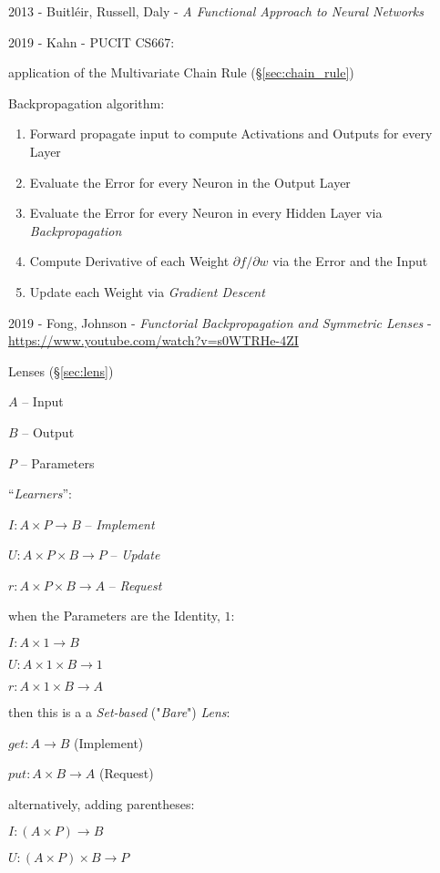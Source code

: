 2013 - Buitl\'eir, Russell, Daly -
\emph{A Functional Approach to Neural Networks}

2019 - Kahn - PUCIT CS667:

application of the Multivariate Chain Rule (\S\ref{sec:chain_rule})

Backpropagation algorithm:
\begin{enumerate}
  \item Forward propagate input to compute Activations and Outputs for every
    Layer
  \item Evaluate the Error for every Neuron in the Output Layer
  \item Evaluate the Error for every Neuron in every Hidden Layer via
    \emph{Backpropagation}
  \item Compute Derivative of each Weight $\partial f / \partial w$ via the
    Error and the Input
  \item Update each Weight via \emph{Gradient Descent}
\end{enumerate}

\asterism

2019 - Fong, Johnson - \emph{Functorial Backpropagation and Symmetric Lenses} -
\url{https://www.youtube.com/watch?v=s0WTRHe-4ZI}

\fist Lenses (\S\ref{sec:lens})

$A$ -- Input

$B$ -- Output

$P$ -- Parameters

``\emph{Learners}'':

$I : A \times P \to B$ -- \emph{Implement}

$U : A \times P \times B \to P$ -- \emph{Update}

$r : A \times P \times B \to A$ -- \emph{Request}

when the Parameters are the Identity, $1$:

$I : A \times 1 \to B$

$U : A \times 1 \times B \to 1$

$r : A \times 1 \times B \to A$

then this is a a \emph{Set-based} ("\emph{Bare}") \emph{Lens}:

$get : A \to B$ (Implement)

$put : A \times B \to A$ (Request)

alternatively, adding parentheses:

$I : (A \times P) \to B$

$U : (A \times P) \times B \to P$

